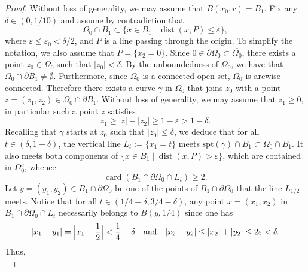 \documentclass[12pt]{article}
\theoremstyle{definition}
\theoremstyle{remark}
\numberwithin{equation}{section}
\DeclareMathOperator{\dist}{dist}
\newcommand{\dd}{\partial}
\newcommand{\abs}[1]{\lvert #1 \rvert}
\newcommand{\card}[1]{\operatorname{card}(#1)}
\newcommand{\spt}{\mathrm{spt}}
\begin{document}
\begin{proof}
    Without loss of generality, we may assume that $B(x_0,r) = B_1$.
    Fix any $\delta \in (0,1/10)$ and assume by contradiction that
    \begin{equation}
        \Omega_0\cap B_1 \subset \{x \in B_1 \mid \dist(x,P) \leq \varepsilon\},
    \end{equation}
    where $\varepsilon \leq \varepsilon_0 < \delta/2$, and $P$ is a line passing through the origin.
    To simplify the notation, we also assume that $P=\{x_2=0\}$. 
    Since
    $0\in\dd\Omega_0\subset\overline{\Omega_0}$, there exists a point $z_0 \in\Omega_0$ such that $\abs{z_0} <
    \delta$. By the unboundedness of $\Omega_0$, we have that $\Omega_0\cap\dd B_1 \neq\emptyset$. Furthermore,
    since $\Omega_0$ is a connected open set, $\Omega_0$ is arcwise connected. Therefore there exists a curve
    $\gamma$ in $\Omega_0$ that joins $z_0$ with a point $z = (z_1,z_2) \in \Omega_0 \cap \partial B_1$.
    Without loss of generality, we may assume that $z_1 \geq 0$, in particular such a point $z$ satisfies
    \begin{equation}
        z_1 \geq \abs{z} - \abs{z_2} \geq 1 - \varepsilon > 1 - \delta.
    \end{equation}
    Recalling that $\gamma$ starts at $z_0$ such that $\abs{z_0} \leq \delta$, we deduce that for all $t \in
    (\delta,1 - \delta)$, the vertical line $L_t := \{x_1 = t\}$ meets $\spt(\gamma) \cap B_1 \subset \Omega_0 \cap
    B_1$. It also meets both components of $\{x \in B_1 \mid \dist(x,P) > \varepsilon \}$, which are contained in
    $\Omega_0^c$, whence
    \begin{equation}
        \card{B_1 \cap \dd\Omega_0\cap L_t} \geq 2.
    \end{equation}
    Let $y = (y_1,y_2) \in B_1 \cap \dd \Omega_0$ be one of the points of $B_1 \cap \dd\Omega_0$ that the line
    $L_{1/2}$ meets. Notice that for all $t \in (1/4+\delta, 3/4 - \delta)$, any point $x = (x_1,x_2)$ in $B_1 \cap
    \dd \Omega_0 \cap L_t$ necessarily belongs to $B(y,1/4)$ since one has 
    \begin{equation}
        \abs{x_1 - y_1} = \Bigl\lvert x_1 - \frac{1}{2} \Bigr\rvert < \frac{1}{4} - \delta
        \quad \text{and} \quad
        \abs{x_2 - y_2} \leq \abs{x_2} + \abs{y_2} \leq 2\varepsilon < \delta. 
    \end{equation}
    Thus,
    \begin{equation}

\end{equation}
\end{proof}
\end{document}
